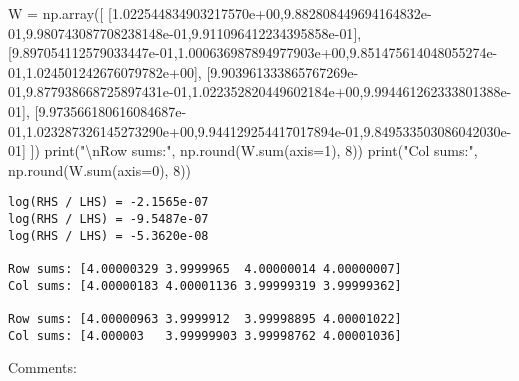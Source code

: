 \documentclass[
  letterpaper,
  DIV=11,
  numbers=noendperiod]{scrartcl}
\newenvironment{Shaded}{\begin{snugshade}}{\end{snugshade}}
\newcommand{\BuiltInTok}[1]{\textcolor[rgb]{0.00,0.23,0.31}{#1}}
\newcommand{\CharTok}[1]{\textcolor[rgb]{0.13,0.47,0.30}{#1}}
\newcommand{\DecValTok}[1]{\textcolor[rgb]{0.68,0.00,0.00}{#1}}
\newcommand{\FloatTok}[1]{\textcolor[rgb]{0.68,0.00,0.00}{#1}}
\newcommand{\NormalTok}[1]{\textcolor[rgb]{0.00,0.23,0.31}{#1}}
\newcommand{\OperatorTok}[1]{\textcolor[rgb]{0.37,0.37,0.37}{#1}}
\newcommand{\StringTok}[1]{\textcolor[rgb]{0.13,0.47,0.30}{#1}}
\begin{document}
\begin{Shaded}
\begin{Highlighting}[]
\NormalTok{W }\OperatorTok{=}\NormalTok{ np.array([}
\NormalTok{[}\FloatTok{1.022544834903217570e+00}\NormalTok{,}\FloatTok{9.882808449694164832e{-}01}\NormalTok{,}\FloatTok{9.980743087708238148e{-}01}\NormalTok{,}\FloatTok{9.911096412234395858e{-}01}\NormalTok{],}
\NormalTok{[}\FloatTok{9.897054112579033447e{-}01}\NormalTok{,}\FloatTok{1.000636987894977903e+00}\NormalTok{,}\FloatTok{9.851475614048055274e{-}01}\NormalTok{,}\FloatTok{1.024501242676079782e+00}\NormalTok{],}
\NormalTok{[}\FloatTok{9.903961333865767269e{-}01}\NormalTok{,}\FloatTok{9.877938668725897431e{-}01}\NormalTok{,}\FloatTok{1.022352820449602184e+00}\NormalTok{,}\FloatTok{9.994461262333801388e{-}01}\NormalTok{],}
\NormalTok{[}\FloatTok{9.973566180616084687e{-}01}\NormalTok{,}\FloatTok{1.023287326145273290e+00}\NormalTok{,}\FloatTok{9.944129254417017894e{-}01}\NormalTok{,}\FloatTok{9.849533503086042030e{-}01}\NormalTok{]}
\NormalTok{])}
\BuiltInTok{print}\NormalTok{(}\StringTok{"}\CharTok{\textbackslash{}n}\StringTok{Row sums:"}\NormalTok{, np.}\BuiltInTok{round}\NormalTok{(W.}\BuiltInTok{sum}\NormalTok{(axis}\OperatorTok{=}\DecValTok{1}\NormalTok{), }\DecValTok{8}\NormalTok{))}
\BuiltInTok{print}\NormalTok{(}\StringTok{"Col sums:"}\NormalTok{, np.}\BuiltInTok{round}\NormalTok{(W.}\BuiltInTok{sum}\NormalTok{(axis}\OperatorTok{=}\DecValTok{0}\NormalTok{), }\DecValTok{8}\NormalTok{))}
\end{Highlighting}
\end{Shaded}

\begin{verbatim}
log(RHS / LHS) = -2.1565e-07
log(RHS / LHS) = -9.5487e-07
log(RHS / LHS) = -5.3620e-08

Row sums: [4.00000329 3.9999965  4.00000014 4.00000007]
Col sums: [4.00000183 4.00001136 3.99999319 3.99999362]

Row sums: [4.00000963 3.9999912  3.99998895 4.00001022]
Col sums: [4.000003   3.99999903 3.99998762 4.00001036]
\end{verbatim}

Comments:
\end{document}
